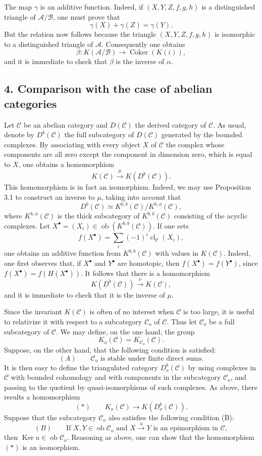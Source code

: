 \documentclass[11pt]{article}
\providecommand{\Ob}{\operatorname{ob}}
\providecommand{\cC}{\mathcal C}
\providecommand{\Ob}{\operatorname{ob}}
\providecommand{\cC}{\mathcal C}
\providecommand{\cA}{\mathcal A}
\providecommand{\cB}{\mathcal B}
\providecommand{\Ob}{\operatorname{Ob}}
\providecommand{\Ob}{\operatorname{ob}}
\providecommand{\Ob}{\operatorname{Ob}}
\begin{document}
The map $\gamma$ is an additive function. Indeed, if $(X,Y,Z,f,g,h)$ is a distinguished triangle of $\cA/\cB$, one must prove that
\[
\gamma(X)+\gamma(Z)=\gamma(Y).
\]
But the relation now follows because the triangle $(X,Y,Z,f,g,h)$ is isomorphic to a distinguished triangle of $\cA$. Consequently one obtains
\[
\beta:K(\cA/\cB)\longrightarrow \operatorname{Coker}(K(i)),
\]
and it is immediate to check that $\beta$ is the inverse of $\alpha$.

\subsection*{4. Comparison with the case of abelian categories}

Let $\cC$ be an abelian category and $D(\cC)$ the derived category of $\cC$. As usual, denote by $D^b(\cC)$ the full subcategory of $D(\cC)$ generated by the bounded complexes. By associating with every object $X$ of $\cC$ the complex whose components are all zero except the component in dimension zero, which is equal to $X$, one obtains a homomorphism
\[
K(\cC)\xrightarrow{\mu}K(D^b(\cC)).
\]
This homomorphism is in fact an isomorphism. Indeed, we may use Proposition 3.1 to construct an inverse to $\mu$, taking into account that
\[
D^b(\cC)\simeq K^{b,b}(\cC)/K^{b,\phi}(\cC),
\]
where $K^{b,\phi}(\cC)$ is the thick subcategory of $K^{b,b}(\cC)$ consisting of the acyclic complexes. Let $X^\bullet=(X_i)\in\Ob(K^{b,b}(\cC))$. If one sets
\[
f(X^\bullet)=\sum_i(-1)^i\operatorname{cl}_{\cC}(X_i),
\]
one obtains an additive function from $K^{b,b}(\cC)$ with values in $K(\cC)$. Indeed, one first observes that, if $X^\bullet$ and $Y^\bullet$ are homotopic, then $f(X^\bullet)=f(Y^\bullet)$, since $f(X^\bullet)=f(H(X^\bullet))$. It follows that there is a homomorphism
\[
K(D^b(\cC))\xrightarrow{\nu}K(\cC),
\]
and it is immediate to check that it is the inverse of $\mu$.

Since the invariant $K(\cC)$ is often of no interest when $\cC$ is too large, it is useful to relativize it with respect to a subcategory $\cC_o$ of $\cC$. Thus let $\cC_o$ be a full subcategory of $\cC$. We may define, on the one hand, the group
\[
K_o(\cC)=K_{\cC_o}(\cC).
\]
Suppose, on the other hand, that the following condition is satisfied:
\[
(A)\qquad \cC_o\text{ is stable under finite direct sums.}
\]
It is then easy to define the triangulated category $D_o^b(\cC)$ by using complexes in $\cC$ with bounded cohomology and with components in the subcategory $\cC_o$, and passing to the quotient by quasi-isomorphisms of such complexes. As above, there results a homomorphism
\[
(*)\qquad K_o(\cC)\longrightarrow K(D_o^b(\cC)).
\]
Suppose that the subcategory $\cC_o$ also satisfies the following condition (B):
\[
(B)\qquad
\text{If }X,Y\in\Ob\cC_o\text{ and }X\xrightarrow{u}Y
\text{ is an epimorphism in }\cC,
\]
then $\operatorname{Ker}u\in\Ob\cC_o$. Reasoning as above, one can show that the homomorphism $(*)$ is an isomorphism.
\end{document}
